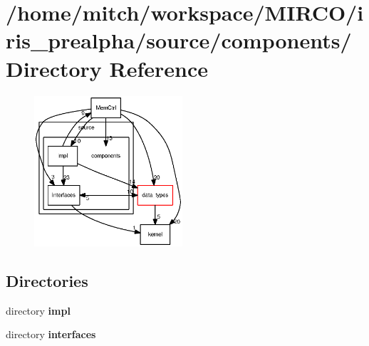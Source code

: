 \section{/home/mitch/workspace/MIRCO/iris\_\-prealpha/source/components/ Directory Reference}
\label{dir_888df40df2842d33ff5e453fbddfc387}


\nopagebreak
\begin{figure}[H]
\begin{center}
\leavevmode
\includegraphics[width=156pt]{dir_888df40df2842d33ff5e453fbddfc387_dep}
\end{center}
\end{figure}
\subsection*{Directories}
\begin{CompactItemize}
\item 
directory {\bf impl}
\item 
directory {\bf interfaces}
\end{CompactItemize}
